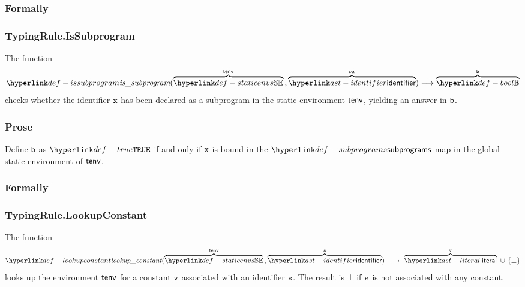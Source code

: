 \subsubsection{Formally}
\begin{mathpar}
\end{mathpar}

\subsubsection{TypingRule.IsSubprogram\label{sec:TypingRule.IsSubprogram}}
\hypertarget{def-issubprogram}{}
The function
\[
\issubprogram(\overname{\staticenvs}{\tenv} \aslsep \overname{\identifier}{vx}) \aslto \overname{\Bool}{\vb}
\]
checks whether the identifier $\vx$ has been declared as a subprogram in the static environment $\tenv$,
yielding an answer in $\vb$.

\subsubsection{Prose}
Define $\vb$ as $\True$ if and only if $\vx$ is bound in the $\subprograms$ map in the global static
environment of $\tenv$.

\subsubsection{Formally}
\begin{mathpar}
\end{mathpar}

\subsubsection{TypingRule.LookupConstant}
\hypertarget{def-lookupconstant}{}
The function
\[
  \lookupconstant(\overname{\staticenvs}{\tenv} \aslsep \overname{\identifier}{\vs})
  \;\aslto\; \overname{\literal}{\vv}\ \cup\ \{\bot\}
\]
looks up the environment $\tenv$ for a constant $\vv$ associated with an identifier
$\vs$. The result is $\bot$ if $\vs$ is not associated with any constant.

